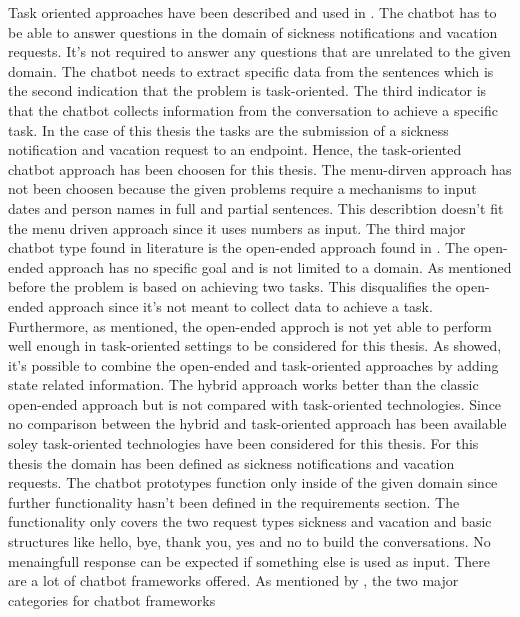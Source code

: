 Task oriented approaches have been described and used in 
\citet{deshpande2017survey, luis2015williams, braunEvaluatingNLU, williams2017hybrid}.
The chatbot has to be able to answer questions in the domain of sickness notifications 
and vacation requests.
It's not required to answer any questions that are unrelated to the given domain.
The chatbot needs to extract specific data from the sentences which is the second 
indication that the problem is task-oriented.
The third indicator is that the chatbot collects information from the 
conversation to achieve a specific task.
In the case of this thesis the tasks are the submission of a sickness notification
and vacation request to an endpoint. 
Hence, the task-oriented chatbot approach has been choosen for this thesis.
The menu-dirven approach has not been choosen because the given problems 
require a mechanisms to input dates and person names in full and partial sentences.
This describtion doesn't fit the menu driven approach since it uses numbers as input.
The third major chatbot type found in literature is the open-ended approach found in 
\citet{williams2017hybrid, bordes2016learning, rahman2017programming}.
The open-ended approach has no specific goal and is not limited to a domain.
As mentioned before the problem is based on achieving two tasks.
This disqualifies the open-ended approach since it's not meant to
collect data to achieve a task.
Furthermore, as \citet{bordes2016learning} mentioned, the open-ended approch is not 
yet able to perform well enough in task-oriented settings to be considered for this 
thesis.
As \citet{williams2017hybrid} showed, it's possible to combine the open-ended and 
task-oriented approaches by adding state related information.
The hybrid approach works better than the classic open-ended approach but 
is not compared with task-oriented technologies.
Since no comparison between the hybrid and task-oriented approach has been available 
soley task-oriented technologies have been considered for this thesis.
For this thesis the domain has been defined as sickness notifications and 
vacation requests.
The chatbot prototypes function only inside of the given domain since further 
functionality hasn't been defined in the requirements section.
The functionality only covers the two request types sickness and vacation and 
basic structures like hello, bye, thank you, yes and no to build the conversations.
No menaingfull response can be expected if something else is used as input.
There are a lot of chatbot frameworks offered.
As mentioned by \citet{kane2016role}, the two major categories for chatbot frameworks 
